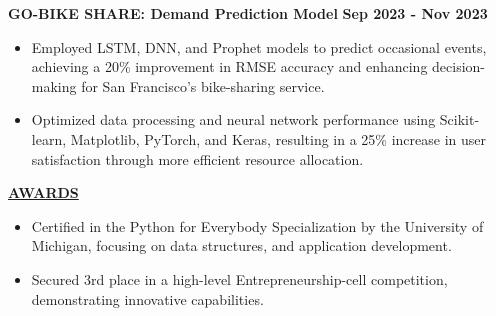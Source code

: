 \documentclass{article}
\begin{document}
\begin{itemize}
\end{itemize}
\noindent \textbf{GO-BIKE SHARE: Demand Prediction Model} \textit \hfill \textbf{Sep 2023 - Nov 2023}  
\begin{itemize}[noitemsep,nolistsep,leftmargin=*]
\item {\small Employed LSTM, DNN, and Prophet models to predict occasional events, achieving a 20\% improvement in RMSE accuracy and enhancing decision-making for San Francisco’s bike-sharing service.}
\item {\small Optimized data processing and neural network performance using Scikit-learn, Matplotlib, PyTorch, and Keras, resulting in a 25\% increase in user satisfaction through more efficient resource allocation.}
\end{itemize}

\begin{itemize}
\end{itemize}
\noindent \textbf{\underline{AWARDS}} 
\begin{itemize}[noitemsep,nolistsep,leftmargin=*]
\item {\small  Certified in the Python for Everybody Specialization by the University of Michigan, focusing on data structures, and application development. }
\end{itemize}
\begin{itemize}[noitemsep,nolistsep,leftmargin=*]
\item {\small Secured 3rd place in a high-level Entrepreneurship-cell competition, demonstrating innovative capabilities. }
\end{itemize}
\end{document}
